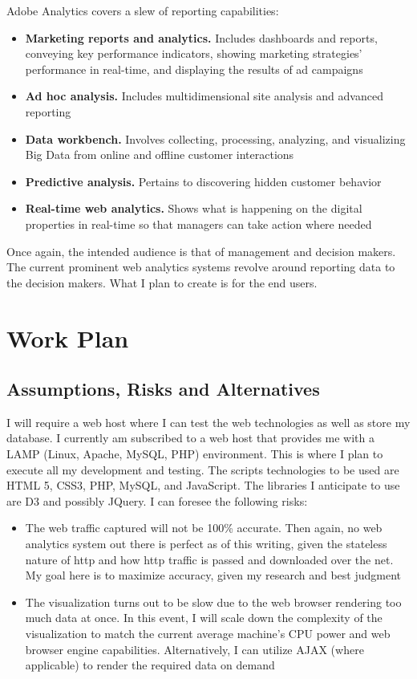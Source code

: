 \documentclass[12pt]{article}
\begin{document}
Adobe Analytics covers a slew of reporting capabilities:

\begin{itemize}
\item \textbf{Marketing reports and analytics.} Includes dashboards and reports, conveying key performance indicators, showing marketing strategies’ performance in real-time, and displaying the results of ad campaigns
\item \textbf{Ad hoc analysis.} Includes multidimensional site analysis and advanced reporting
\item \textbf{Data workbench.} Involves collecting, processing, analyzing, and visualizing Big Data from online and offline customer interactions
\item \textbf{Predictive analysis.} Pertains to discovering hidden customer behavior
\item \textbf{Real-time web analytics.} Shows what is happening on the digital properties in real-time so that managers can take action where needed
\end{itemize}

Once again, the intended audience is that of management and decision makers. The current prominent web analytics systems revolve around reporting data to the decision makers. What I plan to create is for the end users.

\null
\vfill
\section{Work Plan}
\subsection{Assumptions, Risks and Alternatives}
I will require a web host where I can test the web technologies as well as store my database. I currently am subscribed to a web host that provides me with a LAMP (Linux, Apache, MySQL, PHP) environment. This is where I plan to execute all my development and testing. The scripts technologies to be used are HTML 5, CSS3, PHP, MySQL, and JavaScript. The libraries I anticipate to use are D3 and possibly JQuery.
I can foresee the following risks:

\begin{itemize}
\item The web traffic captured will not be 100\% accurate. Then again, no web analytics system out there is perfect as of this writing, given the stateless nature of http and how http traffic is passed and downloaded over the net. My goal here is to maximize accuracy, given my research and best judgment
\item The visualization turns out to be slow due to the web browser rendering too much data at once. In this event, I will scale down the complexity of the visualization to match the current average machine's CPU power and web browser engine capabilities. Alternatively, I can utilize AJAX (where applicable) to render the required data on demand
\end{itemize}
\end{document}

